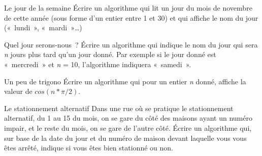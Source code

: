 \begin{Exercice}{Le jour de la semaine}
	Écrire un algorithme qui lit un jour du mois de novembre de cette année
	(sous forme d’un entier entre 1 et 30) 
	et qui affiche le nom du jour («~lundi~», «~mardi~»\dots)
\end{Exercice}

\begin{Exercice}{Quel jour serons-nous~?}
	Écrire un algorithme qui indique le nom du jour 
	qui sera \textit{n} jours plus tard qu’un jour donné. 
	Par exemple si le jour donné est «~mercredi~» et \textit{n} = 10, 
	l’algorithme indiquera «~samedi~».
\end{Exercice}

\begin{Exercice}{Un peu de trigono}
	Écrire un algorithme qui pour un entier \textit{n} donné, 
	affiche la valeur de $cos(n * \pi/2)$.
\end{Exercice}

\begin{Exercice}{Le stationnement alternatif}
	Dans une rue où se pratique le stationnement alternatif, 
	du 1 au 15 du mois, on se gare du côté des maisons ayant un numéro impair, 
	et le reste du mois, on se gare de l’autre côté. 
	Écrire un algorithme qui, sur base de la date du jour et du numéro de maison
	devant laquelle vous vous êtes arrêté, 
	indique si vous êtes bien stationné ou non.
\end{Exercice}
